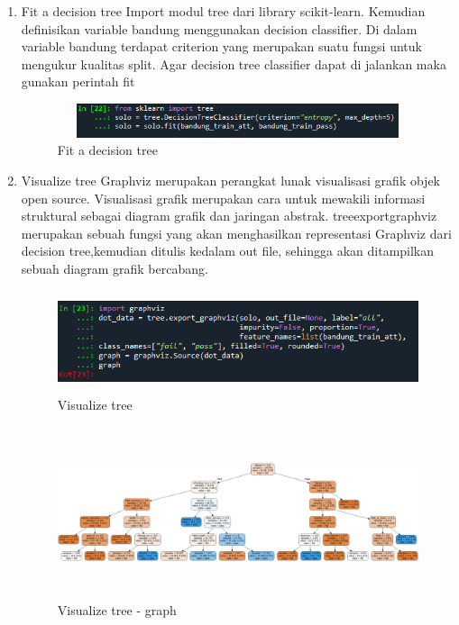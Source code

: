 \begin{enumerate}
\item Fit a decision tree
\newline Import modul tree dari library scikit-learn. Kemudian definisikan variable bandung menggunakan decision classifier. Di dalam variable bandung terdapat criterion yang merupakan suatu fungsi untuk mengukur kualitas split. Agar decision tree classifier dapat di jalankan maka gunakan perintah fit
\begin{figure}[!htbp]
	\centering
	\includegraphics[width=12cm,height=1cm]{figures/decision_tree.png}
	\caption{Fit a decision tree}
	\label{penanda}
\end{figure}

\item Visualize tree
\newline Graphviz merupakan perangkat lunak visualisasi grafik objek open source. Visualisasi grafik merupakan cara untuk mewakili informasi struktural sebagai diagram grafik dan jaringan abstrak. treeexportgraphviz merupakan sebuah fungsi yang akan menghasilkan representasi Graphviz dari decision tree,kemudian ditulis kedalam out file, sehingga akan ditampilkan sebuah diagram grafik bercabang.
\begin{figure}[!htbp]
	\centering
	\includegraphics[width=11cm,height=3cm]{figures/graphviz.png}
	\caption{Visualize tree}
	\label{penanda}
\end{figure}
\begin{figure}[!htbp]
	\centering
	\includegraphics[width=17cm,height=5cm]{figures/visualize_tree.png}
	\caption{Visualize tree - graph}
	\label{penanda}
\end{figure}


\end{enumerate}

